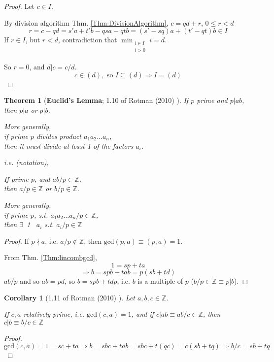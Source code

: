 \documentclass[10pt]{amsart}
\newtheorem{theorem}{Theorem}
\newtheorem{corollary}{Corollary}
\begin{document}
\begin{multicols*}{2}
\begin{proof}
Let $c\in I$.  

By division algorithm Thm. \ref{Thm:DivisionAlgorithm}, $c=qd + r$, $0\leq r <d$
\[
r=c-qd = s'a+t'b - qsa - qtb = (s'-sq)a + (t'-qt)b \in I
\]
If $r\in I$, but $r<d$, contradiction that $\min_{ \substack{ i \in I \\ i>0 \\ } } i =d$.  

So $r=0$, and $d|c=c/d$.  
\[
c \in (d), \text{ so } I\subseteq (d) \Longrightarrow I =(d)
\]
\end{proof}


\begin{theorem}[\textbf{Euclid's Lemma}; 1.10 of Rotman (2010) \cite{JRotman2010}]
If $p$ prime and $p|ab$, then $p|a$ or $p|b$.  

More generally,  \\
if prime $p$ divides product $a_1a_2\dots a_n$, \\
then it must divide at least 1 of the factors $a_i$.  

i.e. (notation),  

If prime $p$, and $ab/p \in \mathbb{Z}$, \\
then $a/p\in \mathbb{Z}$ or $b/p \in \mathbb{Z}$.  

More generally, \\
if prime $p$, s.t. $a_1a_2 \dots a_n/p \in \mathbb{Z}$, \\
then $\exists \, $ 1 \, $a_i$ s.t. $a_i/p \in \mathbb{Z}$
\end{theorem}
\begin{proof}
If $p\nmid a$, i.e. $a/p \notin \mathbb{Z}$, then $\text{gcd}(p,a)  \equiv (p,a) =1$.  

From Thm. \ref{Thm:lincombgcd}, 
\[
1 = sp+ta
\]
\[
\Longrightarrow b = spb + tab = p(sb+td)
\]
$ab/p$ and so $ab=pd$, so $b=spb+tdp$, i.e. $b$ is a multiple of $p$ ($b/p \in \mathbb{Z} \equiv p | b$).  




\end{proof}

\begin{corollary}[1.11 of Rotman (2010) \cite{JRotman2010}]\label{Cor:relprimefactors}
Let $a,b,c \in \mathbb{Z}$.  

If $c,a$ relatively prime, i.e. $\text{gcd}(c,a)=1$, and if $c|ab \equiv ab/c\in \mathbb{Z}$,
then $c|b \equiv b/c \in \mathbb{Z}$
\end{corollary}
\begin{proof}
\[
\text{gcd}(c,a)=1 = sc+ta \Longrightarrow b=sbc + tab = sbc + t(qc) = c(sb+tq) \Longrightarrow b/c = sb+tq 
\]
\end{proof}


\end{multicols*}
\end{document}
